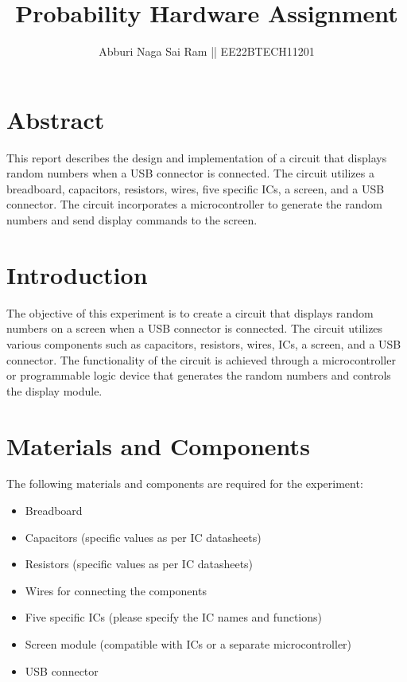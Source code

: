 \documentclass{article}
\begin{document}
\title{Probability Hardware Assignment}
\author{Abburi Naga Sai Ram || EE22BTECH11201}
\maketitle

\section{Abstract}
This report describes the design and implementation of a circuit that displays random numbers when a USB connector is connected. The circuit utilizes a breadboard, capacitors, resistors, wires, five specific ICs, a screen, and a USB connector. The circuit incorporates a microcontroller to generate the random numbers and send display commands to the screen.

\section{Introduction}
The objective of this experiment is to create a circuit that displays random numbers on a screen when a USB connector is connected. The circuit utilizes various components such as capacitors, resistors, wires, ICs, a screen, and a USB connector. The functionality of the circuit is achieved through a microcontroller or programmable logic device that generates the random numbers and controls the display module.

\section{Materials and Components}
The following materials and components are required for the experiment:
\begin{itemize}
  \item Breadboard
  \item Capacitors (specific values as per IC datasheets)
  \item Resistors (specific values as per IC datasheets)
  \item Wires for connecting the components
  \item Five specific ICs (please specify the IC names and functions)
  \item Screen module (compatible with ICs or a separate microcontroller)
  \item USB connector
\end{itemize}
\end{document}
